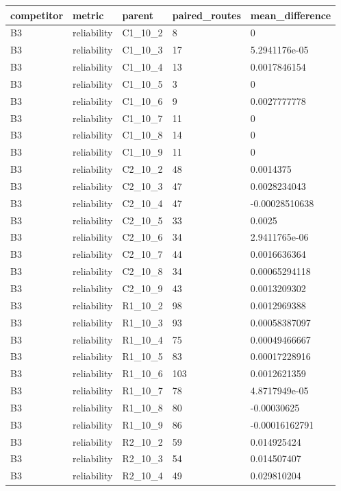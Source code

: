 \begin{longtable}{lllll}
\hline
competitor & metric & parent & paired\_routes & mean\_difference \\
\hline
B3 & reliability & C1\_10\_2 & 8 & 0 \\
B3 & reliability & C1\_10\_3 & 17 & 5.2941176e-05 \\
B3 & reliability & C1\_10\_4 & 13 & 0.0017846154 \\
B3 & reliability & C1\_10\_5 & 3 & 0 \\
B3 & reliability & C1\_10\_6 & 9 & 0.0027777778 \\
B3 & reliability & C1\_10\_7 & 11 & 0 \\
B3 & reliability & C1\_10\_8 & 14 & 0 \\
B3 & reliability & C1\_10\_9 & 11 & 0 \\
B3 & reliability & C2\_10\_2 & 48 & 0.0014375 \\
B3 & reliability & C2\_10\_3 & 47 & 0.0028234043 \\
B3 & reliability & C2\_10\_4 & 47 & -0.00028510638 \\
B3 & reliability & C2\_10\_5 & 33 & 0.0025 \\
B3 & reliability & C2\_10\_6 & 34 & 2.9411765e-06 \\
B3 & reliability & C2\_10\_7 & 44 & 0.0016636364 \\
B3 & reliability & C2\_10\_8 & 34 & 0.00065294118 \\
B3 & reliability & C2\_10\_9 & 43 & 0.0013209302 \\
B3 & reliability & R1\_10\_2 & 98 & 0.0012969388 \\
B3 & reliability & R1\_10\_3 & 93 & 0.00058387097 \\
B3 & reliability & R1\_10\_4 & 75 & 0.00049466667 \\
B3 & reliability & R1\_10\_5 & 83 & 0.00017228916 \\
B3 & reliability & R1\_10\_6 & 103 & 0.0012621359 \\
B3 & reliability & R1\_10\_7 & 78 & 4.8717949e-05 \\
B3 & reliability & R1\_10\_8 & 80 & -0.00030625 \\
B3 & reliability & R1\_10\_9 & 86 & -0.00016162791 \\
B3 & reliability & R2\_10\_2 & 59 & 0.014925424 \\
B3 & reliability & R2\_10\_3 & 54 & 0.014507407 \\
B3 & reliability & R2\_10\_4 & 49 & 0.029810204 \\

\end{longtable}

